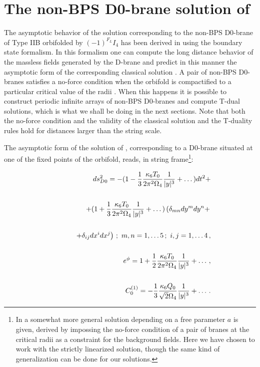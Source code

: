 \documentclass[12pt,a4paper]{article}
\begin{document}
 
\section{The non-BPS D0-brane solution of \cite{EP}}

The asymptotic behavior of the solution corresponding to the
non-BPS D0-brane of Type IIB orbifolded by $(-1)^{F_L}I_4$
has been derived in \cite{EP} using the boundary state formalism.
In this formalism one can compute the long distance behavior
of the massless fields generated by the D-brane and predict in
this manner the asymptotic form of the corresponding classical 
solution \cite{DFLPRS}. 
A pair of non-BPS D0-branes satisfies a no-force
condition when the orbifold is compactified to a particular 
critical value of the radii
\cite{GS,MOT}. When this happens it is possible to construct
periodic infinite arrays of non-BPS D0-branes
and compute T-dual solutions, which is what we shall be doing in the
next sections. Note that both the no-force condition and the validity
of the classical solution and the T-duality rules hold for distances
larger than the string scale.

The asymptotic form of the solution of \cite{EP}, corresponding to a
D0-brane situated at one of the fixed points of the orbifold,
reads, in string frame\footnote{In \cite{EP} a somewhat more general solution
depending on a free parameter $a$ is given, derived by
impossing the no-force condition of a pair of branes at the critical radii
as a constraint for the background fields. Here we have chosen to work
with the strictly linearized solution, though the same kind of 
generalization can be done for our solutions.}:

\begin{eqnarray}
\label{D0}
&&ds_{D0}^2= -(1-{1\over 3}
{\kappa_6 T_0 \over 2\pi^2\Omega_4}
{1 \over |y|^3}+\dots)dt^2+\nonumber\\
&&\nonumber\\
&&\hspace{1cm}+(1+{1\over 3}{\kappa_6 T_0 \over
2\pi^2\Omega_4}{1\over |y|^3}+\dots)\left(
\delta_{mn}dy^m dy^n+\right.
\nonumber\\
&& \nonumber\\
&&\hspace{1cm}\left.+\delta_{ij}dx^idx^j\right) \, ; \,\,m,n=1,\dots 5\, ;
\,\, i,j=1,\dots 4\, ,\nonumber\\
& &\nonumber\\
&&e^\phi = 1+{1\over 2}{\kappa_6 T_0\over 2\pi^2\Omega_4}
{1\over |y|^3}+\dots \, ,\nonumber\\
& &\nonumber\\
&&C^{(1)}_0=-{1\over 3} {\kappa_6 Q_0 \over \sqrt{2}\Omega_4}
{1\over |y|^3}+\dots\, .
\end{eqnarray}
\end{document}

